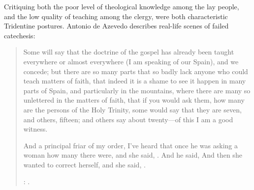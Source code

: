 Critiquing both the poor level of theological knowledge among the lay people, and the low quality of teaching among the clergy, were both characteristic Tridentine postures.
Antonio de Azevedo describes real-life scenes of failed catechesis:
\begin{quotation}
  Some will say that the doctrine of the gospel has already been taught everywhere or almost everywhere (I am speaking of our Spain), and we concede;
  but there are so many parts that so badly lack anyone who could teach matters of faith,
  that indeed it is a shame to see it happen in many parts of Spain, and particularly in the  mountains,
  where there are many so unlettered  in the matters of faith,
  that if you would ask them, how many are the persons of the Holy Trinity, some would say that they are seven, and others, fifteen; and others say about twenty---of this I am a good witness.

  And a principal friar of my order, I've heard that once he was asking a woman how many  there were, and she said, .
  And he said, 
  And then she wanted to correct herself, and she said, .%
  \begin{Footnote}
    \Autocite[26]{Azevedo:Catecismo}:
    .
  \end{Footnote}
\end{quotation}

